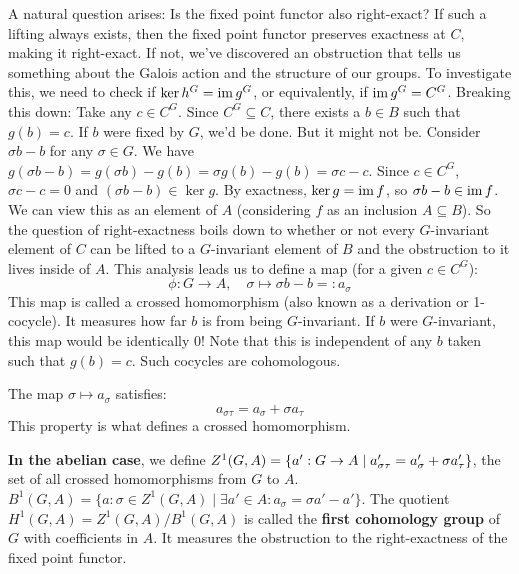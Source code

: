 \begin{outline}
    \1 A natural question arises: Is the fixed point functor also right-exact? If such a lifting always exists, then the fixed point functor preserves exactness at $C$, making it right-exact.
    If not, we've discovered an obstruction that tells us something about the Galois action and the structure of our groups.
    \1 To investigate this, we need to check if $\ker h^G = \operatorname{im} g^G$, or equivalently, if $\operatorname{im} g^G = C^G$. Breaking this down:
        \2 Take any $c \in C^G$. 
        \2 Since $C^G \subseteq C$, there exists a $b \in B$ such that $g(b) = c$.
        \2 If $b$ were fixed by $G$, we'd be done. But it might not be. 
            \3 Consider $\sigma b - b$ for any $\sigma \in G$. We have $g(\sigma b - b) = g(\sigma b) - g(b)= \sigma g(b)-g(b)=\sigma c - c$. 
            \3 Since $c\in C^G$, $\sigma c - c = 0$ and $(\sigma b-b)\in \ker g$.
            \3 By exactness, $\ker g = \operatorname{im} f$, so $\sigma b - b \in \operatorname{im} f$.
            \3 We can view this as an element of $A$ (considering $f$ as an inclusion $A \subseteq B$).
    \1[] So the question of right-exactness boils down to whether or not every $G$-invariant element of $C$ can be lifted to a $G$-invariant element of $B$ and the obstruction to it lives inside of $A$. 
    \1 This analysis leads us to define a map (for a given $c\in C^G$):
    $$\phi: G \to A, \quad \sigma \mapsto \sigma b - b =: a_\sigma$$
    This map is called a crossed homomorphism (also known as a derivation or 1-cocycle). It measures how far $b$ is from being $G$-invariant. If $b$ were $G$-invariant, this map would be identically $0$! Note that this is independent of any $b$ taken such that $g(b)=c$. Such cocycles are cohomologous.
    
\begin{proposition}
    The map $\sigma \mapsto a_\sigma$ satisfies:
    $$a_{\sigma\tau} = a_\sigma + \sigma a_\tau$$
    This property is what defines a crossed homomorphism.
\end{proposition}

    \1 \textbf{In the abelian case}, we define 
        \2 $Z^1(G,A)=\{a':G\rightarrow A \mid a'_{\sigma \tau} = a'_{\sigma}+\sigma a'_{\tau}\}$, the set of all crossed homomorphisms from $G$ to $A$.
        \2 $B^1(G,A)=\{a:\sigma \in Z^1(G,A) \mid \exists a'\in A : a_\sigma = \sigma a' - a'\}$. 
        \2 The quotient $H^1(G,A) = Z^1(G,A) / B^1(G,A)$ is called the \textbf{first cohomology group} of $G$ with coefficients in $A$. It measures the obstruction to the right-exactness of the fixed point functor.
    

\end{outline}
